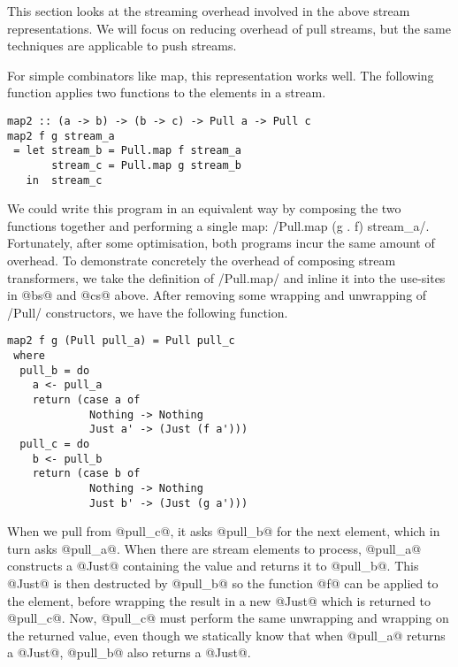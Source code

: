 
This section looks at the streaming overhead involved in the above stream representations.
We will focus on reducing overhead of pull streams, but the same techniques are applicable to push streams.

For simple combinators like map, this representation works well.
The following function applies two functions to the elements in a stream.

\begin{lstlisting}
map2 :: (a -> b) -> (b -> c) -> Pull a -> Pull c
map2 f g stream_a
 = let stream_b = Pull.map f stream_a
       stream_c = Pull.map g stream_b
   in  stream_c
\end{lstlisting}

We could write this program in an equivalent way by composing the two functions together and performing a single map: \Hs/Pull.map (g . f) stream_a/.
Fortunately, after some optimisation, both programs incur the same amount of overhead.
To demonstrate concretely the overhead of composing stream transformers, we take the definition of \Hs/Pull.map/ and inline it into the use-sites in @bs@ and @cs@ above.
After removing some wrapping and unwrapping of \Hs/Pull/ constructors, we have the following function.

\begin{lstlisting}
map2 f g (Pull pull_a) = Pull pull_c
 where
  pull_b = do
    a <- pull_a
    return (case a of
             Nothing -> Nothing
             Just a' -> (Just (f a')))
  pull_c = do
    b <- pull_b
    return (case b of
             Nothing -> Nothing
             Just b' -> (Just (g a')))
\end{lstlisting}

When we pull from @pull_c@, it asks @pull_b@ for the next element, which in turn asks @pull_a@.
When there are stream elements to process, @pull_a@ constructs a @Just@ containing the value and returns it to @pull_b@.
This @Just@ is then destructed by @pull_b@ so the function @f@ can be applied to the element, before wrapping the result in a new @Just@ which is returned to @pull_c@.
Now, @pull_c@ must perform the same unwrapping and wrapping on the returned value, even though we statically know that when @pull_a@ returns a @Just@, @pull_b@ also returns a @Just@.

